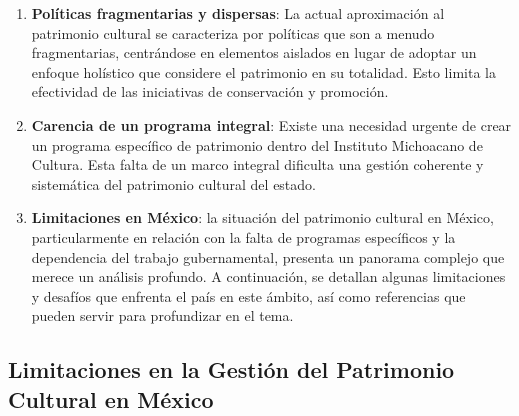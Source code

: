 \documentclass[
  spanish,
  11pt,
  a4paper,
]{scrbook}
\providecommand{\tightlist}{%
  \setlength{\itemsep}{0pt}\setlength{\parskip}{0pt}}
\begin{document}
\begin{enumerate}
\def\labelenumi{\arabic{enumi}.}
\tightlist
\item
  \textbf{Políticas fragmentarias y dispersas}: La actual aproximación
  al patrimonio cultural se caracteriza por políticas que son a menudo
  fragmentarias, centrándose en elementos aislados en lugar de adoptar
  un enfoque holístico que considere el patrimonio en su totalidad. Esto
  limita la efectividad de las iniciativas de conservación y promoción.
\item
  \textbf{Carencia de un programa integral}: Existe una necesidad
  urgente de crear un programa específico de patrimonio dentro del
  Instituto Michoacano de Cultura. Esta falta de un marco integral
  dificulta una gestión coherente y sistemática del patrimonio cultural
  del estado.
\item
  \textbf{Limitaciones en México}: la situación del patrimonio cultural
  en México, particularmente en relación con la falta de programas
  específicos y la dependencia del trabajo gubernamental, presenta un
  panorama complejo que merece un análisis profundo. A continuación, se
  detallan algunas limitaciones y desafíos que enfrenta el país en este
  ámbito, así como referencias que pueden servir para profundizar en el
  tema.
\end{enumerate}

\subsection*{Limitaciones en la Gestión del Patrimonio Cultural en
México}\label{limitaciones-en-la-gestiuxf3n-del-patrimonio-cultural-en-muxe9xico}
\end{document}
